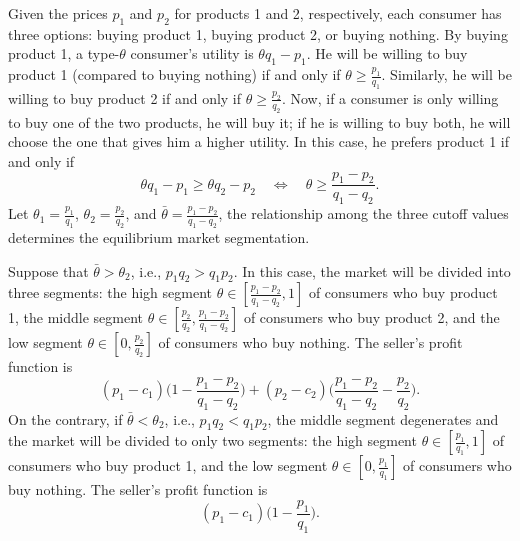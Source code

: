 \documentclass[11pt,a4paper]{article}
\begin{document}
Given the prices $p_1$ and $p_2$ for products 1 and 2, respectively,
each consumer has three options: buying product 1, buying product 2,
or buying nothing. By buying product 1, a type-$\theta$ consumer's utility
is $\theta q_1 - p_1$. He will be willing to buy product 1 (compared to
buying nothing) if and only if $\theta \geq \frac{p_1}{q_1}$.
Similarly, he will be willing to buy product 2 if and only if
$\theta \geq \frac{p_2}{q_2}$. Now, if a consumer is only willing to buy
one of the two products, he will buy it; if he is willing to buy both,
he will choose the one that gives him a higher utility.
In this case, he prefers product 1 if and only if
\[
	\theta q_1 - p_1 \geq \theta q_2 - p_2 \quad\Leftrightarrow\quad
	\theta \geq \frac{p_1 - p_2}{q_1 - q_2}.
\]
Let $\theta_1 = \frac{p_1}{q_1}$, $\theta_2 = \frac{p_2}{q_2}$,
and $\bar{\theta} = \frac{p_1 - p_2}{q_1 - q_2}$, the relationship
among the three cutoff values determines the equilibrium market segmentation.

Suppose that $\bar{\theta} > \theta_2$, i.e., $p_1q_2 > q_1p_2$.
In this case, the market will be divided into three segments:
the high segment $\theta \in [\frac{p_1 - p_2}{q_1 - q_2}, 1]$ of consumers
who buy product 1,
the middle segment $\theta \in [\frac{p_2}{q_2}, \frac{p_1 - p_2}{q_1 - q_2}]$
of consumers who buy product 2, and
the low segment $\theta \in [0, \frac{p_2}{q_2}]$ of consumers who buy nothing.
The seller's profit function is
\[
	(p_1 - c_1)\bigg(1 - \frac{p_1 - p_2}{q_1 - q_2}\bigg)
	+ (p_2 - c_2)\bigg(\frac{p_1 - p_2}{q_1 - q_2} - \frac{p_2}{q_2}\bigg).
\]
On the contrary, if $\bar{\theta} < \theta_2$, i.e., $p_1q_2 < q_1p_2$,
the middle segment degenerates and the market will be divided to only two segments:
the high segment $\theta \in [\frac{p_1}{q_1}, 1]$ of consumers
who buy product 1, and
the low segment $\theta \in [0, \frac{p_1}{q_1}]$ of consumers who buy nothing.
The seller's profit function is
\[
	(p_1 - c_1)\bigg(1 - \frac{p_1}{q_1}\bigg).
\]
\end{document}

